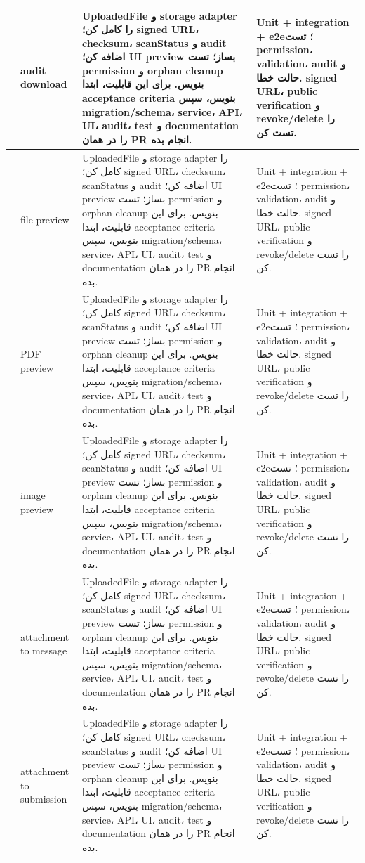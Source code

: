 \documentclass[11pt,a4paper]{article}
\begin{document}
\begin{longtable}{|>{\raggedleft\arraybackslash}p{}|>{\raggedleft\arraybackslash}p{}|>{\raggedleft\arraybackslash}p{}|>{\raggedleft\arraybackslash}p{}|}
232 & audit download & UploadedFile و storage adapter را کامل کن؛ signed URL، checksum، scanStatus و audit اضافه کن؛ UI preview بساز؛ تست permission و orphan cleanup بنویس. برای این قابلیت، ابتدا acceptance criteria بنویس، سپس migration/schema، service، API، UI، audit، test و documentation را در همان PR انجام بده. & Unit + integration + e2e؛ تست permission، validation، audit و حالت خطا. signed URL، public verification و revoke/delete را تست کن. \\ \hline
233 & file preview & UploadedFile و storage adapter را کامل کن؛ signed URL، checksum، scanStatus و audit اضافه کن؛ UI preview بساز؛ تست permission و orphan cleanup بنویس. برای این قابلیت، ابتدا acceptance criteria بنویس، سپس migration/schema، service، API، UI، audit، test و documentation را در همان PR انجام بده. & Unit + integration + e2e؛ تست permission، validation، audit و حالت خطا. signed URL، public verification و revoke/delete را تست کن. \\ \hline
234 & PDF preview & UploadedFile و storage adapter را کامل کن؛ signed URL، checksum، scanStatus و audit اضافه کن؛ UI preview بساز؛ تست permission و orphan cleanup بنویس. برای این قابلیت، ابتدا acceptance criteria بنویس، سپس migration/schema، service، API، UI، audit، test و documentation را در همان PR انجام بده. & Unit + integration + e2e؛ تست permission، validation، audit و حالت خطا. signed URL، public verification و revoke/delete را تست کن. \\ \hline
235 & image preview & UploadedFile و storage adapter را کامل کن؛ signed URL، checksum، scanStatus و audit اضافه کن؛ UI preview بساز؛ تست permission و orphan cleanup بنویس. برای این قابلیت، ابتدا acceptance criteria بنویس، سپس migration/schema، service، API، UI، audit، test و documentation را در همان PR انجام بده. & Unit + integration + e2e؛ تست permission، validation، audit و حالت خطا. signed URL، public verification و revoke/delete را تست کن. \\ \hline
236 & attachment to message & UploadedFile و storage adapter را کامل کن؛ signed URL، checksum، scanStatus و audit اضافه کن؛ UI preview بساز؛ تست permission و orphan cleanup بنویس. برای این قابلیت، ابتدا acceptance criteria بنویس، سپس migration/schema، service، API، UI، audit، test و documentation را در همان PR انجام بده. & Unit + integration + e2e؛ تست permission، validation، audit و حالت خطا. signed URL، public verification و revoke/delete را تست کن. \\ \hline
237 & attachment to submission & UploadedFile و storage adapter را کامل کن؛ signed URL، checksum، scanStatus و audit اضافه کن؛ UI preview بساز؛ تست permission و orphan cleanup بنویس. برای این قابلیت، ابتدا acceptance criteria بنویس، سپس migration/schema، service، API، UI، audit، test و documentation را در همان PR انجام بده. & Unit + integration + e2e؛ تست permission، validation، audit و حالت خطا. signed URL، public verification و revoke/delete را تست کن. \\ \hline

\end{longtable}
\end{document}
